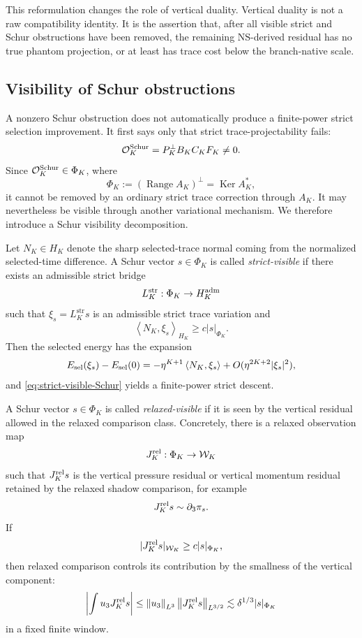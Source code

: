 \documentclass[11pt]{article}
\numberwithin{equation}{section}
\DeclareMathOperator{\Range}{Range}
\DeclareMathOperator{\Ker}{Ker}
\newcommand{\str}{\mathrm{str}}
\newcommand{\NS}{\mathrm{NS}}
\newcommand{\norm}[2]{\left\|#1\right\|_{#2}}
\newcommand{\ip}[2]{\left\langle #1,#2\right\rangle}
\newcommand{\calO}{\mathcal O}
\begin{document}
This reformulation changes the role of vertical duality.  Vertical duality is not a raw compatibility identity.  It is the assertion that, after all visible strict and Schur obstructions have been removed, the remaining \(\NS\)-derived residual has no true phantom projection, or at least has trace cost below the branch-native scale.

\subsection{Visibility of Schur obstructions}\label{subsec:Schur-visibility}

A nonzero Schur obstruction does not automatically produce a finite-power strict selection improvement.  It first says only that strict trace-projectability fails:
\[
        \calO_K^{\rm Schur}=P_K^\perp B_KC_KF_K\ne0.
\]
Since \(\calO_K^{\rm Schur}\in\Phi_K\), where
\[
        \Phi_K:=(\Range A_K)^\perp=\Ker A_K^*,
\]
it cannot be removed by an ordinary strict trace correction through \(A_K\).  It may nevertheless be visible through another variational mechanism.  We therefore introduce a Schur visibility decomposition.

Let \(N_K\in H_K\) denote the sharp selected-trace normal coming from the normalized selected-time difference.  A Schur vector \(s\in\Phi_K\) is called \emph{strict-visible} if there exists an admissible strict bridge
\[
        L_K^{\str}:\Phi_K\to H_K^{\rm adm}
\]
such that \(\xi_s=L_K^{\str}s\) is an admissible strict trace variation and
\begin{equation}\label{eq:strict-visible-Schur}
        \ip{N_K}{\xi_s}_{H_K}\ge c|s|_{\Phi_K}.
\end{equation}
Then the selected energy has the expansion
\[
        E_{\rm sel}(\xi_s)-E_{\rm sel}(0)
        =-\eta^{K+1}\ip{N_K}{\xi_s}
        +O(\eta^{2K+2}|\xi_s|^2),
\]
and \eqref{eq:strict-visible-Schur} yields a finite-power strict descent.

A Schur vector \(s\in\Phi_K\) is called \emph{relaxed-visible} if it is seen by the vertical residual allowed in the relaxed comparison class.  Concretely, there is a relaxed observation map
\begin{equation}\label{eq:Jrel-general}
        J_K^{\rm rel}:\Phi_K\to\mathcal W_K
\end{equation}
such that \(J_K^{\rm rel}s\) is the vertical pressure residual or vertical momentum residual retained by the relaxed shadow comparison, for example
\[
        J_K^{\rm rel}s\sim \partial_3\pi_s.
\]
If
\begin{equation}\label{eq:rel-visible-lower}
        |J_K^{\rm rel}s|_{\mathcal W_K}\ge c|s|_{\Phi_K},
\end{equation}
then relaxed comparison controls its contribution by the smallness of the vertical component:
\begin{equation}\label{eq:rel-pairing-general}
        \left|\int u_3 J_K^{\rm rel}s\right|
        \le \norm{u_3}{L^3}\norm{J_K^{\rm rel}s}{L^{3/2}}
        \lesssim \delta^{1/3}|s|_{\Phi_K}
\end{equation}
in a fixed finite window.
\end{document}
